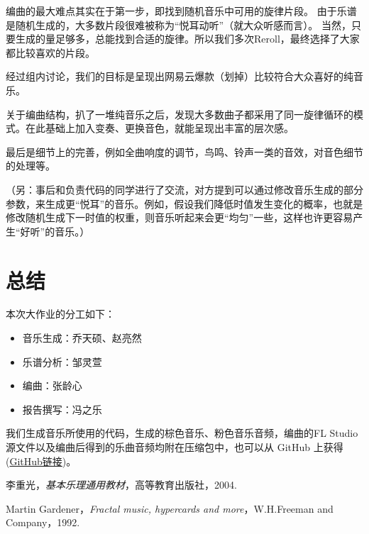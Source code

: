 \documentclass[a4paper,12pt]{article} %
\begin{document}
编曲的最大难点其实在于第一步，即找到随机音乐中可用的旋律片段。
由于乐谱是随机生成的，大多数片段很难被称为“悦耳动听”（就大众听感而言）。
当然，只要生成的量足够多，总能找到合适的旋律。所以我们多次Reroll，最终选择了大家都比较喜欢的片段。

经过组内讨论，我们的目标是呈现出网易云爆款（划掉）比较符合大众喜好的纯音乐。

关于编曲结构，扒了一堆纯音乐之后，发现大多数曲子都采用了同一旋律循环的模式。在此基础上加入变奏、更换音色，就能呈现出丰富的层次感。

最后是细节上的完善，例如全曲响度的调节，鸟鸣、铃声一类的音效，对音色细节的处理等。

（另：事后和负责代码的同学进行了交流，对方提到可以通过修改音乐生成的部分参数，来生成更“悦耳”的音乐。例如，假设我们降低时值发生变化的概率，也就是修改随机生成下一时值的权重，则音乐听起来会更“均匀”一些，这样也许更容易产生“好听”的音乐。）

\section{总结}
本次大作业的分工如下：
\begin{itemize}
    \item 音乐生成：乔天硕、赵亮然
    \item 乐谱分析：邹灵萱
    \item 编曲：张龄心
    \item 报告撰写：冯之乐
\end{itemize}

我们生成音乐所使用的代码，生成的棕色音乐、粉色音乐音频，编曲的FL Studio源文件以及编曲后得到的乐曲音频均附在压缩包中，也可以从 GitHub 上获得(\href{https://github.com/lindseyzh/Music-and-Mathematics}{GitHub链接})。

\begin{thebibliography}{9}
 李重光，\emph{基本乐理通用教材}，高等教育出版社，2004.

 Martin Gardener，\emph{Fractal music, hypercards and more}，W.H.Freeman and Company，1992.

\end{thebibliography}
\end{document}
